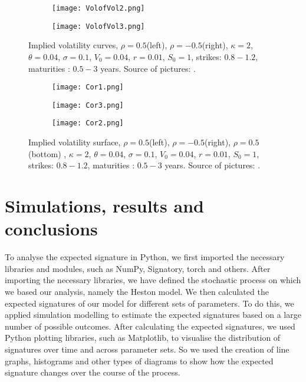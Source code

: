 \documentclass[12pt,a4paper]{report}
\theoremstyle{definition}
\begin{document}
\begin{figure}[!htbp]
	\centering
	\begin{subfigure}{0.5\textwidth}
		\centering
		\texttt{[image: VolofVol2.png]}
		\caption{}
		\label{fig:sub1}
	\end{subfigure}%
	\begin{subfigure}{0.5\textwidth}
		\centering
		\texttt{[image: VolofVol3.png]}
		\caption{}
		\label{fig:sub2}
	\end{subfigure}
	\caption{Implied volatility curves, $\rho = 0.5$(left), $\rho = -0.5$(right), $\kappa = 2$,
		$\theta = 0.04$, $\sigma = 0.1$, $V_0 = 0.04$, $r = 0.01$, $S_0 =1$, strikes: $0.8 - 1.2$, maturities : $0.5 - 3$ years. Source of pictures: \parencite{moodley2005heston}.}
	\label{Fig3.8}
\end{figure}

\begin{figure}[!htbp]
	\centering
	\begin{subfigure}{0.5\textwidth}
		\centering
		\texttt{[image: Cor1.png]}
		\caption{}
		\label{fig:sub1}
	\end{subfigure}%
	\begin{subfigure}{0.5\textwidth}
		\centering
		\texttt{[image: Cor3.png]}
		\caption{}
		\label{fig:sub2}
	\end{subfigure}
	\begin{subfigure}{0.5\textwidth}
	\centering
	\texttt{[image: Cor2.png]}
	\caption{}
	\label{fig:sub3}
	\end{subfigure}%
	\caption{Implied volatility surface, $\rho = 0.5$(left), $\rho = -0.5$(right), $\rho = 0.5$(bottom) , $\kappa = 2$,
		$\theta = 0.04$, $\sigma = 0.1$, $V_0 = 0.04$, $r = 0.01$, $S_0 =1$, strikes: $0.8 - 1.2$, maturities : $0.5 - 3$ years. Source of pictures: \parencite{moodley2005heston}.}
	\label{Fig3.5}
\end{figure}





\section{Simulations, results and conclusions}

To analyse the expected signature in Python, we first imported the necessary libraries and modules, such as NumPy, Signatory, torch and others. After importing the necessary libraries, we have defined the stochastic process on which we based our analysis, namely the Heston model. We then calculated the expected signatures of our model for different sets of parameters. To do this, we applied simulation modelling to estimate the expected signatures based on a large number of possible outcomes. After calculating the expected signatures, we used Python plotting libraries, such as Matplotlib, to visualise the distribution of signatures over time and across parameter sets. So we used the creation of line graphs, histograms and other types of diagrams to show how the expected signature changes over the course of the process.
\end{document}
